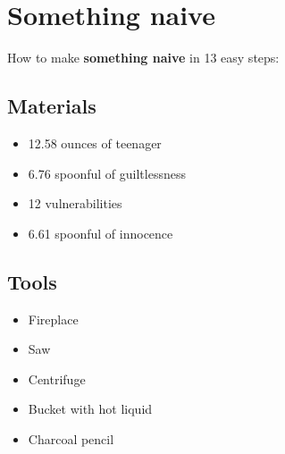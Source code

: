 \documentclass{article}
\begin{document}
\section{Something naive}How to make \textbf{something naive} in 13 easy steps:

\subsection{Materials}\begin{itemize}
\item 
12.58 ounces of teenager
\item 
6.76 spoonful of guiltlessness
\item 
12 vulnerabilities
\item 
6.61 spoonful of innocence
\end{itemize}
\subsection{Tools}\begin{itemize}
\item 
Fireplace
\item 
Saw
\item 
Centrifuge
\item 
Bucket with hot liquid
\item 
Charcoal pencil
\end{itemize}
\end{document}
